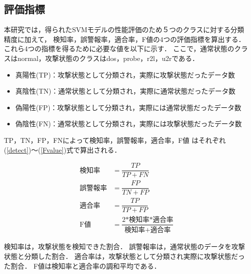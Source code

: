 \subsection{評価指標}
本研究では，得られたSVMモデルの性能評価のため５つのクラスに対する分類精度に加えて，
検知率，誤警報率，適合率，F値の4つの評価指標を算出する．
これら4つの指標を得るために必要な値を以下に示す．
ここで，通常状態のクラスはnormal，攻撃状態のクラスはdos，probe，r2l，u2rである．
\begin{itemize}
    \item 真陽性(TP)：攻撃状態として分類され，実際に攻撃状態だったデータ数
    \item 真陰性(TN)：通常状態として分類され，実際に通常状態だったデータ数
    \item 偽陽性(FP)：攻撃状態として分類され，実際には通常状態だったデータ数
    \item 偽陰性(FN)：通常状態として分類され，実際には攻撃状態だったデータ数
\end{itemize}
TP，TN，FP，FNによって検知率，誤警報率，適合率，F値
はそれぞれ(\ref{detect})〜(\ref{Fvalue})式で算出される．

\setlength{\jot}{12pt}
\begin{align}
\text{検知率} &= \dfrac{TP}{TP + FN}\label{detect}\\
\text{誤警報率} &= \dfrac{FP}{TN + FP}\\
\text{適合率} &= \dfrac{TP}{TP + FP}\\
\text{F値} &= \dfrac{2\text{*検知率*適合率}}{\text{検知率}+\text{適合率}}\label{Fvalue}
\end{align}

検知率は，攻撃状態を検知できた割合．
誤警報率は，通常状態のデータを攻撃状態と分類した割合．
適合率は，攻撃状態として分類され実際に攻撃状態だった割合．
F値は検知率と適合率の調和平均である．
